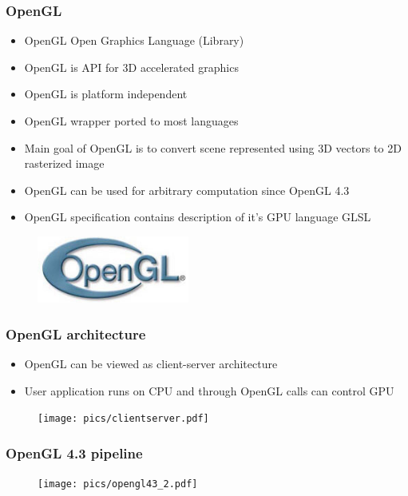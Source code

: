 
\begin{frame}
\frametitle{OpenGL}
  \begin{itemize}
  \item OpenGL Open Graphics Language (Library) 
  \item OpenGL is API for 3D accelerated graphics 
  \item OpenGL is platform independent
  \item OpenGL wrapper ported to most languages
  \item Main goal of OpenGL is to convert scene represented using 3D vectors to 2D rasterized image
  \item OpenGL can be used for arbitrary computation since OpenGL 4.3
  \item OpenGL specification contains description of it's GPU language GLSL
  \end{itemize}
  \begin{figure}[h]
  \includegraphics[width=5cm,keepaspectratio]{pics/opengl_logo.jpg}
  \end{figure}
\end{frame}

\begin{frame}
\frametitle{OpenGL architecture}
  \begin{itemize}
    \item OpenGL can be viewed as client-server architecture
    \item User application runs on CPU and through OpenGL calls can control GPU
  \end{itemize}
  \begin{figure}[h]
    \texttt{[image: pics/clientserver.pdf]}
  \end{figure}
\end{frame}

\begin{frame}
\frametitle{OpenGL 4.3 pipeline}
  \begin{figure}[h]
  \texttt{[image: pics/opengl43\_2.pdf]}
  \end{figure}
\end{frame}

